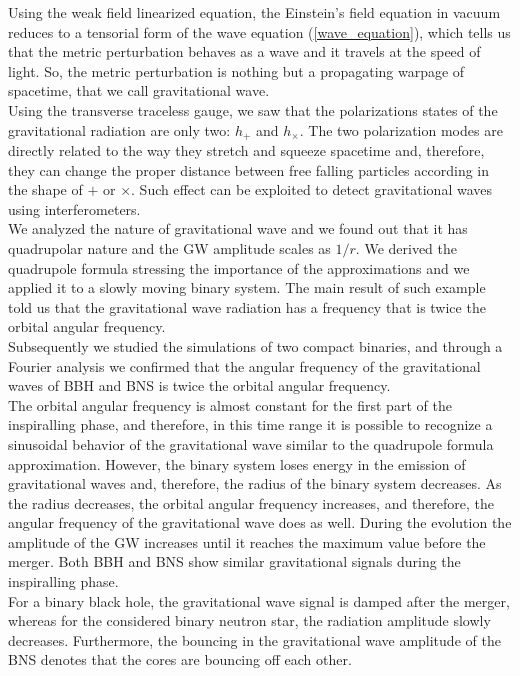 Using the weak field linearized equation, the Einstein's field equation in vacuum reduces to a tensorial form of the wave equation (\ref{wave_equation}), which tells us that the metric perturbation behaves as a wave and it travels at the speed of light.
So, the metric perturbation is nothing but a propagating warpage of spacetime, that we call gravitational wave.\\
Using the transverse traceless gauge, we saw that the polarizations states of the gravitational radiation are only two: $h_{+}$ and $h_{\times}$.
The two polarization modes are directly related to the way they stretch and squeeze spacetime and, therefore, they can change the proper distance between free falling particles according in the shape of $+$ or $\times$.
Such effect can be exploited to detect gravitational waves using interferometers.\\
We analyzed the nature of gravitational wave  and we found out that it has quadrupolar nature and the GW amplitude scales as $1/r$.
We derived the quadrupole formula stressing the importance of the approximations and we applied it to a slowly moving binary system.
The main result of such example told us that the gravitational wave radiation has a frequency that is twice the orbital angular frequency.\\
Subsequently we studied the simulations of two compact binaries, and through a Fourier analysis we confirmed that the angular frequency of the gravitational waves of BBH and BNS is twice the orbital angular frequency.\\
The orbital angular frequency is almost constant for the first part of the inspiralling phase, and therefore, in this time range it is possible to recognize a sinusoidal behavior of the gravitational wave similar to the quadrupole formula approximation.
However, the binary system loses energy in the emission of gravitational waves and, therefore, the radius of the binary system decreases. 
As the radius decreases, the orbital angular frequency increases, and therefore, the angular frequency of the gravitational wave does as well. 
During the evolution the amplitude of the GW increases until it reaches the maximum value before the merger.
Both BBH and BNS show similar gravitational signals during the inspiralling phase.\\
For a binary black hole, the gravitational wave signal is damped after the merger, whereas for the considered binary neutron star, the radiation amplitude slowly decreases.
Furthermore, the bouncing in the gravitational wave amplitude of the BNS denotes that the cores are bouncing off each other.\\
